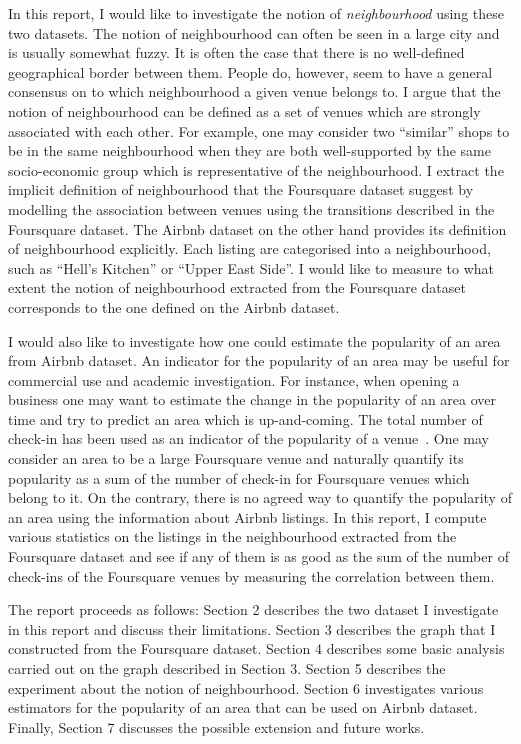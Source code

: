 In this report, I would like to investigate the notion of \emph{neighbourhood} using these two datasets. The notion of neighbourhood can often be seen in a large city and is usually somewhat fuzzy. It is often the case that there is no well-defined geographical border between them. People do, however, seem to have a general consensus on to which neighbourhood  a given venue belongs to. I argue that the notion of neighbourhood can be defined as a set of venues which are strongly associated with each other. For example, one may consider two ``similar'' shops to be in the same neighbourhood when they are both well-supported by the same socio-economic group which is representative of the neighbourhood. I extract the implicit definition of neighbourhood that the Foursquare dataset suggest by modelling the association between venues using the transitions described in the Foursquare dataset. The Airbnb dataset on the other hand provides its definition of neighbourhood explicitly. Each listing are categorised into a neighbourhood, such as ``Hell's Kitchen'' or ``Upper East Side''. I would like to measure to what extent the notion of neighbourhood extracted from the Foursquare dataset corresponds to the one defined on the Airbnb dataset.

I would also like to investigate how one could estimate the popularity of an area from Airbnb dataset. An indicator for the popularity of an area may be useful for commercial use and academic investigation. For instance, when opening a business one may want to estimate the change in the popularity of an area over time and try to predict an area which is up-and-coming. The total number of check-in has been used as an indicator of the popularity of a venue~\citep{noulas2011empirical}. One may consider an area to be a large Foursquare venue and naturally quantify its popularity as a sum of the number of check-in for Foursquare venues which belong to it. On the contrary, there is no agreed way to quantify the popularity of an area using the information about Airbnb listings. In this report, I compute various statistics on the listings in the neighbourhood extracted from the Foursquare dataset and see if any of them is as good as the sum of the number of check-ins of the Foursquare venues by measuring the correlation between them.

The report proceeds as follows: Section 2 describes the two dataset I investigate in this report and discuss their limitations. Section 3 describes the graph that I constructed from the Foursquare dataset. Section 4 describes some basic analysis carried out on the graph described in Section 3. Section 5 describes the experiment about the notion of neighbourhood. Section 6 investigates various estimators for the popularity of an area that can be used on Airbnb dataset. Finally, Section 7 discusses the possible extension and future works.